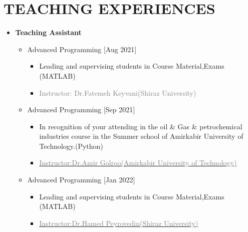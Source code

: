 \documentclass[10pt,a4paper,sans]{moderncv} %
\begin{document}
	\section{TEACHING EXPERIENCES}
	\begin{itemize}
		\item \textbf{Teaching Assistant}    
		\vspace{0.5em}
		\begin{itemize}
			\item {} Advanced Programming   \hfill[Aug 2021]
			\begin{itemize} 
    				\item Leading and supervising students in Course Material,Exams (MATLAB)
				\item\textcolor{gray}{Instructor: Dr.Fatemeh Keyvani(Shiraz University)}
			\end{itemize}
	 		
				\newline
			
		
	\end{itemize}
	
	\vspace{0.5em}
	
	\begin{itemize}
			\item {}  Advanced Programming  \hfill[Sep 2021]
			\begin{itemize} 
				\item In recognition of your attending in the oil \& Gas \& petrochemical industries course in the Summer school of Amirkabir University of Technology.(Python)
				\item\href{https://aut.ac.ir/cv/2035/amir-golroo?slc_lang=en&&cv=2035&mod=scv}{\textcolor{gray}{Instructor:Dr.Amir Golroo(Amirkabir University of Technology)}}
			\end{itemize}
				\newline
	
	\end{itemize}
	
	\vspace{0.5em}
	
		\begin{itemize}
			\item {} Advanced Programming  \hfill[Jan 2022]
			\begin{itemize} 
				\item Leading and supervising students in Course Material,Exams (MATLAB)
				\item\href{https://scholar.google.com/citations?hl=en&user=KG__hzQAAAAJ}{\textcolor{gray}{Instructor:Dr.Hamed Peyrovedin(Shiraz University)}}
				

\end{itemize}
\end{itemize}
\end{itemize}
\end{document}
